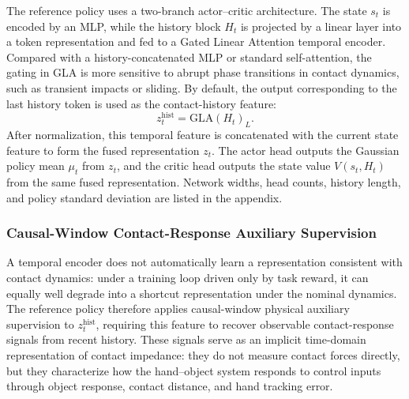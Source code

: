 The reference policy uses a two-branch actor--critic architecture.
The state $s_t$ is encoded by an MLP, while the history block $H_t$
is projected by a linear layer into a token representation and fed
to a Gated Linear Attention temporal encoder. Compared with a
history-concatenated MLP or standard self-attention, the gating in
GLA is more sensitive to abrupt phase transitions in contact
dynamics, such as transient impacts or sliding. By default, the
output corresponding to the last history token is used as the
contact-history feature:
\begin{equation}
z_t^{\mathrm{hist}} = \mathrm{GLA}(H_t)_L.
\label{eq:zhist}
\end{equation}
After normalization, this temporal feature is concatenated with the
current state feature to form the fused representation $z_t$. The
actor head outputs the Gaussian policy mean $\mu_t$ from $z_t$, and
the critic head outputs the state value $V(s_t, H_t)$ from the same
fused representation. Network widths, head counts, history length,
and policy standard deviation are listed in the appendix.


\subsubsection{Causal-Window Contact-Response Auxiliary Supervision}
\label{sec:aux}

A temporal encoder does not automatically learn a representation
consistent with contact dynamics: under a training loop driven only
by task reward, it can equally well degrade into a shortcut
representation under the nominal dynamics. The reference policy
therefore applies causal-window physical auxiliary supervision to
$z_t^{\mathrm{hist}}$, requiring this feature to recover observable
contact-response signals from recent history. These signals serve as
an implicit time-domain representation of contact impedance: they do
not measure contact forces directly, but they characterize how the
hand--object system responds to control inputs through object
response, contact distance, and hand tracking error.

